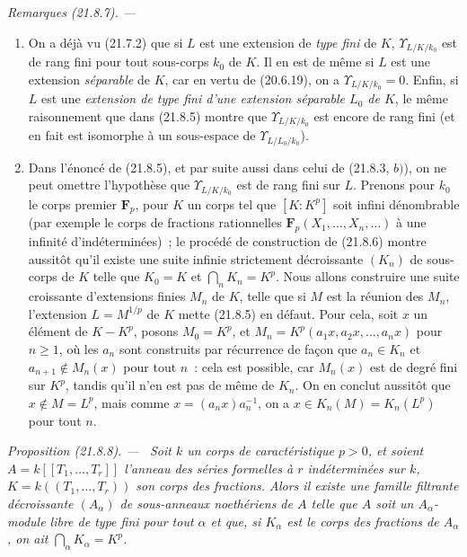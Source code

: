 \documentclass[10pt,oneside]{book}
\makeatletter
\newcommand{\setmanualcurrentlabel}[1]{\def\@currentlabel{#1}}
\newcommand{\oldpage}[2][]{%
  \setcounter{footnote}{0}%
  \marginpar{\scriptsize\textbf{#1}~|~#2}\ignorespaces}
\newenvironment{proposition}[1][]{%
  \setmanualcurrentlabel{#1}\par\medskip\noindent\itshape Proposition (#1). ---\ }{\par}
\newenvironment{remarks}[1][]{%
  \setmanualcurrentlabel{#1}\par\medskip\noindent\itshape Remarques (#1). ---\ }{\par}
\makeatother
\begin{document}
\begin{remarks}[21.8.7]
\label{0.21.8.7-fr}
\begin{enumerate}
  \item[(i)] On a déjà vu (21.7.2) que si $L$ est une extension de
  \emph{type fini} de $K$, $\Upsilon_{L/K/k_0}$ est de rang fini pour tout
  sous-corps $k_0$ de $K$. Il en est de même si $L$ est une extension
  \emph{séparable} de $K$, car en vertu de (20.6.19), on a
  $\Upsilon_{L/K/k_0}=0$. Enfin, si $L$ est une \emph{extension de type fini
  d'une extension séparable $L_0$ de $K$}, le même raisonnement que dans
  (21.8.5) montre que $\Upsilon_{L/K/k_0}$ est encore de rang fini (et en fait
  est isomorphe à un sous-espace de $\Upsilon_{L/L_0/k_0}$).

  \oldpage[0\textsubscript{IV-1}]{175}
  \item[(ii)] Dans l'énoncé de (21.8.5), et par suite aussi dans celui de
  (21.8.3, $b)$), on ne peut omettre l'hypothèse que $\Upsilon_{L/K/k_0}$ est
  de rang fini sur $L$. Prenons pour $k_0$ le corps premier $\mathbf F_p$,
  pour $K$ un corps tel que $[K:K^p]$ soit infini dénombrable (par exemple le
  corps de fractions rationnelles $\mathbf F_p(X_1,\ldots,X_n,\ldots)$ à une
  infinité d'indéterminées)~; le procédé de construction de (21.8.6) montre
  aussitôt qu'il existe une suite infinie strictement décroissante $(K_n)$ de
  sous-corps de $K$ telle que $K_0=K$ et $\bigcap_nK_n=K^p$. Nous allons
  construire une suite croissante d'extensions finies $M_n$ de $K$, telle que
  si $M$ est la réunion des $M_n$, l'extension $L=M^{1/p}$ de $K$ mette
  (21.8.5) en défaut. Pour cela, soit $x$ un élément de $K-K^p$, posons
  $M_0=K^p$, et $M_n=K^p(a_1x,a_2x,\ldots,a_nx)$ pour $n\geqslant1$, où les
  $a_n$ sont construits par récurrence de façon que $a_n\in K_n$ et
  $a_{n+1}\notin M_n(x)$ pour tout $n$~: cela est possible, car $M_n(x)$ est
  de degré fini sur $K^p$, tandis qu'il n'en est pas de même de $K_n$. On en
  conclut aussitôt que $x\notin M=L^p$, mais comme
  $x=(a_nx)a_n^{-1}$, on a $x\in K_n(M)=K_n(L^p)$ pour tout $n$.
\end{enumerate}
\end{remarks}

\begin{proposition}[21.8.8]
\label{0.21.8.8-fr}
Soit $k$ un corps de caractéristique $p>0$, et soient
$A=k[[T_1,\ldots,T_r]]$ l'anneau des séries formelles à $r$ indéterminées sur
$k$, $K=k((T_1,\ldots,T_r))$ son corps des fractions. Alors il existe une
famille filtrante décroissante $(A_\alpha)$ de sous-anneaux noethériens de $A$
telle que $A$ soit un $A_\alpha$-module libre de type fini pour tout $\alpha$
et que, si $K_\alpha$ est le corps des fractions de $A_\alpha$, on ait
$\bigcap_\alpha K_\alpha=K^p$.
\end{proposition}
\end{document}
